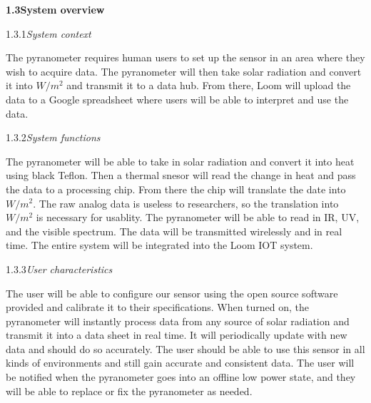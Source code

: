 \documentclass[10pt,draftclsnofoot,onecolumn,letterpaper]{article}
\begin{document}
{\fontsize{10pt}{12.0pt} \textbf{1.3\quad System overview}\\\selectfont 
\par}\par
{\fontsize{10pt}{12.0pt} 1.3.1\quad \textit{System context}\\\selectfont 
\par}\par
{\fontsize{10pt}{12.0pt} 
The pyranometer requires human users to set up the sensor in an area where they wish to acquire data. The pyranometer will then take solar radiation and convert it into $W/m^2$ and transmit it to a data hub. From there, Loom will upload the data to a Google spreadsheet where users will be able to interpret and use the data.\\\selectfont 
\par}\par

{\fontsize{10pt}{12.0pt} 1.3.2\quad \textit{System functions}\\\selectfont 
\par}\par
{\fontsize{10pt}{12.0pt} The pyranometer will be able to take in solar radiation and convert it into heat using black Teflon. Then a thermal snesor will read the change in heat and pass the data to a processing chip. From there the chip will translate the date into $W/m^2$. The raw analog data is useless to researchers, so the translation into $W/m^2$ is necessary for usablity. The pyranometer will be able to read in IR, UV, and the visible spectrum. The data will be transmitted wirelessly and in real time. The entire system will be integrated into the Loom IOT system.\\\selectfont 
\par}\par

\pagebreak

{\fontsize{10pt}{12.0pt} 1.3.3\quad \textit{User characteristics}\\\selectfont 
\par}\par
{\fontsize{10pt}{12.0pt} The user will be able to configure our sensor using the open source software provided and calibrate it to their specifications. When turned on, the pyranometer will instantly process data from any source of solar radiation and transmit it into a data sheet in real time. It will periodically update with new data and should do so accurately. The user should be able to use this sensor in all kinds of environments and still gain accurate and consistent data. The user will be notified when the pyranometer goes into an offline low power state, and they will be able to replace or fix the pyranometer as needed. \\\selectfont 
\par}\par
\end{document}
